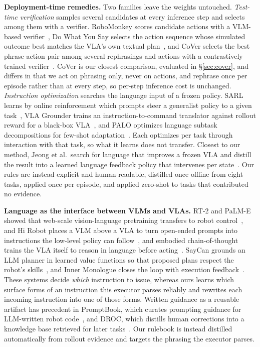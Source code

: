\documentclass[letterpaper, 10 pt, conference]{ieeeconf} %
\begin{document}
\textbf{Deployment-time remedies. }
Two families leave the weights untouched. \emph{Test-time verification} samples several candidates at every inference step and selects among them with a verifier. RoboMonkey scores candidate actions with a VLM-based verifier~\cite{kwok2025robomonkey}, Do What You Say selects the action sequence whose simulated outcome best matches the VLA's own textual plan~\cite{wu2026dowhatyousay}, and CoVer selects the best phrase-action pair among several rephrasings and actions with a contrastively trained verifier~\cite{kwok2026scaling}. CoVer is our closest comparison, evaluated in \S\ref{sec:cover}, and differs in that we act on phrasing only, never on actions, and rephrase once per episode rather than at every step, so per-step inference cost is unchanged. \emph{Instruction optimization} searches the language input of a frozen policy. SARL learns by online reinforcement
which prompts steer a generalist policy to a given
task~\cite{bhatia2026sarl}, VLA Grounder trains an instruction-to-command
translator against rollout reward for a black-box
VLA~\cite{shodiev2026grounder}, and PALO optimizes language subtask
decompositions for few-shot adaptation~\cite{myers2024palo}. Each optimizes per task through interaction with that task, so what it learns does not transfer. Closest to our method, Jeong et al.\ search for language that improves a frozen VLA and distill the result into a learned language feedback policy that intervenes per state~\cite{jeong2026whattosay}. Our rules are instead explicit and human-readable, distilled once offline from eight tasks, applied once per episode, and applied zero-shot to tasks that contributed no evidence.

\textbf{Language as the interface between VLMs and VLAs. }
RT-2 and PaLM-E showed that web-scale vision-language pretraining
transfers to robot control~\cite{zitkovich2023rt2, driess2023palme}, and
Hi Robot places a VLM above a VLA to turn open-ended prompts into instructions the low-level policy can follow~\cite{shi2025hirobot}, and embodied chain-of-thought trains the VLA itself to reason in language before acting~\cite{zawalski2024ecot}. SayCan
grounds an LLM planner in learned value functions so that proposed plans
respect the robot's skills~\cite{ahn2022saycan}, and Inner Monologue
closes the loop with execution feedback~\cite{huang2022inner}. These systems decide \emph{which} instruction to issue, whereas ours learns which surface forms of an instruction this executor parses reliably and rewrites each incoming instruction into one of those forms. Written guidance as a reusable artifact has precedent in PromptBook, which curates prompting guidance for LLM-written robot code~\cite{arenas2024promptbook}, and DROC, which distills human corrections into a knowledge base retrieved for later tasks~\cite{zha2024droc}. Our rulebook is instead distilled automatically from rollout evidence and targets the phrasing the executor parses.
\end{document}
